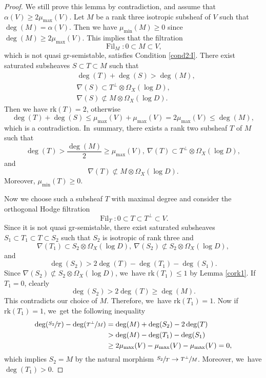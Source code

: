 \documentclass[11pt]{article}
\numberwithin{equation}{section}
\newcommand{\grsemistable}{gr\nobreakdash-semi\-stable\xspace}
\DeclareMathOperator{\Filt}{Fil}
\newcommand{\rk}{\mathrm{rk}}
\theoremstyle{plain}
\theoremstyle{definition}
\begin{document}
\begin{proof}
We still prove this lemma by contradiction, and assume that $\alpha(V)\geq2\mu_{\max}(V)$. Let $M$ be a rank three isotropic subsheaf of $V$ such that $\deg(M)=\alpha(V)$. Then we have $\mu_{\min}(M)\geq0$ since $\deg(M)\geq 2\mu_{\max}(V)$. This implies that the filtration
\[
\Filt_{M}:0\subset M\subset V,
\]
which is not quasi \grsemistable, satisfies Condition \eqref{cond2:I}. There exist saturated subsheaves $S\subset T\subset M$ such that
\begin{align*}
& \deg(T)+\deg(S)>\deg(M), \\
& \nabla(S)\subset T^\perp\otimes\Omega_X(\log D), \\
& \nabla(S)\not\subset M\otimes\Omega_X(\log D).
\end{align*}
Then we have $\rk(T)=2$, otherwise
\[
\deg(T)+\deg(S)\leq \mu_{\max}(V)+\mu_{\max}(V)=2\mu_{\max}(V)\leq \deg(M),
\]
which is a contradiction. In~summary, there exists a rank two subsheaf $T$ of $M$ such that
\[
\deg(T)>\frac{\deg(M)}{2}\geq \mu_{\max}(V),\ \nabla(T)\subset T^\perp\otimes\Omega_X(\log D),
\]
and
\[
\nabla(T)\not\subset M\otimes\Omega_X(\log D).
\]
Moreover, $\mu_{\min}(T)\geq 0$.

Now we choose such a subsheaf $T$ with maximal degree and consider the orthogonal Hodge filtration
\[
\Filt_{T}:0\subset T\subset T^\perp\subset V.
\]
Since it is not quasi \grsemistable, there exist saturated subsheaves $S_1\subset T_1\subset T\subset S_2$ such that $S_2$ is isotropic of rank three and
\[
\nabla(T_1)\subset S_2\otimes\Omega_X(\log D),\ \nabla(S_2)\not\subset S_2\otimes\Omega_X(\log D),
\]
and
\[
\deg(S_2)>2\deg(T)-\deg(T_1)-\deg(S_1).
\]
Since $\nabla(S_2)\not\subset S_2\otimes\Omega_X(\log D)$, we~have $\rk(T_1)\leq1$ by Lemma \ref{cork1}. If $T_1=0$, clearly
\[
\deg(S_2)>2\deg(T)\geq \deg(M).
\]
This contradicts our choice of $M$. Therefore, we~have $\rk(T_1)=1$. Now if $\rk(T_1)=1$, we~get the following inequality
\begin{equation*}
\begin{split}
\deg(\sfrac{S_2}{T})-\deg(\sfrac{T^\perp}{M})&=\deg(M)+\deg(S_2)-2\deg(T)\\
&>\deg(M)-\deg(T_1)-\deg(S_1)\\
&\ge2\mu_{\max}(V)-\mu_{\max}(V)-\mu_{\max}(V)=0,
\end{split}
\end{equation*}
which implies $S_2=M$ by the natural morphism $\sfrac{S_2}{T}\to \sfrac{T^\perp}{M}$. Moreover, we~have $\deg(T_1)>0$.


\end{proof}
\end{document}
